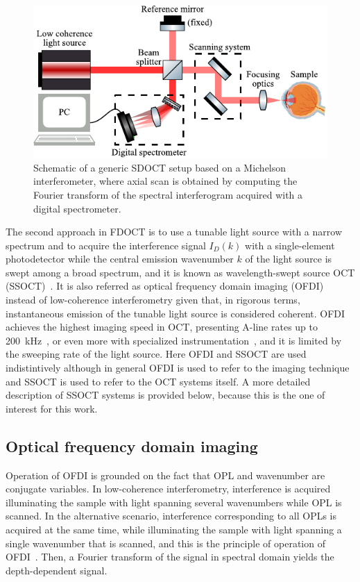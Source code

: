 \begin{figure}[htb!]
    \centering
    \includegraphics[width=.75\textwidth]{Figures/TheoreticalBasis/SDOCT_Scheme.pdf}
    \caption[Schematic of a generic SDOCT setup based on a Michelson interferometer.]{Schematic of a generic SDOCT setup based on a Michelson interferometer, where axial scan is obtained by computing the Fourier transform of the spectral interferogram acquired with a digital spectrometer.}
    \label{fig:SDOCT_Scheme}
\end{figure}

The second approach in FDOCT is to use a tunable light source with a narrow spectrum and to acquire the interference signal $I_D(k)$ with a single-element photodetector while the central emission wavenumber $k$ of the light source is swept among a broad spectrum, and it is known as wavelength-swept source OCT (SSOCT)~\cite{Chinn1997_Optical, Yun2003_Highspeed}. It is also referred as optical frequency domain imaging (OFDI)~\cite{Bouma2015_Optical} instead of low-coherence interferometry given that, in rigorous terms, instantaneous emission of the tunable light source is considered coherent. OFDI achieves the highest imaging speed in OCT, presenting A-line rates up to 200~kHz~\cite{Okabe2012_200}, or even more with specialized instrumentation~\cite{Oh2010_400}, and it is limited by the sweeping rate of the light source. Here OFDI and SSOCT are used indistintively although in general OFDI is used to refer to the imaging technique and SSOCT is used to refer to the OCT systems itself. A more detailed description of SSOCT systems is provided below, because this is the one of interest for this work.

\subsection{Optical frequency domain imaging}

Operation of OFDI is grounded on the fact that OPL and wavenumber are conjugate variables. In low-coherence interferometry, interference is acquired illuminating the sample with light spanning several wavenumbers while OPL is scanned. In the alternative scenario, interference corresponding to all OPLs is acquired  at the same time, while illuminating the sample with light spanning a single wavenumber that is scanned, and this is the principle of operation of OFDI~\cite{Yun2003_Highspeed}. Then, a Fourier transform of the signal in spectral domain yields the depth-dependent signal.

